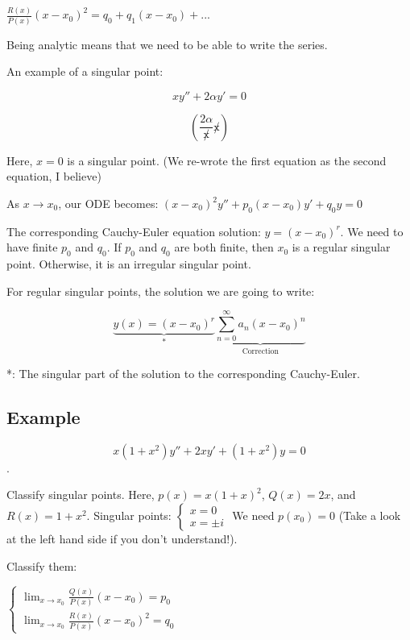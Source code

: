 \documentclass{article}
\begin{document}
$\frac{R(x)}{P(x)} (x - x_0)^2 = q_0 + q_1 (x - x_0) + ...$

Being analytic means that we need to be able to write the series. 

An example of a singular point:


$$xy'' + 2 \alpha y' = 0$$

$$\left(\frac{2 \alpha}{\not x} \not x \right)$$



Here, $x = 0$ is a singular point. (We re-wrote the first equation as the second equation, I believe)

\hfill \break

As $x \longrightarrow x_0$, our ODE becomes: $(x - x_0)^2 y'' + p_0 (x - x_0) y' + q_0 y = 0$

The corresponding Cauchy-Euler equation solution: $y = (x - x_0)^r$. We need to have finite $p_0$ and $q_0$. If $p_0$ and $q_0$ are both finite, then $x_0$ is a regular singular point. Otherwise, it is an irregular singular point. 

For regular singular points, the solution we are going to write: 

$$\underbrace{y(x) = (x - x_0)^r}_{*} \underbrace{\sum_{n = 0}^{\infty} a_n (x - x_0)^n}_{\text{Correction}}$$

*: The singular part of the solution to the corresponding Cauchy-Euler. 

\subsection{Example}

$$x(1+x^2) y'' + 2xy' + (1+x^2) y = 0$$. 

Classify singular points. Here, $p(x) = x(1+x)^2$, $Q(x) = 2x$, and $R(x) = 1+x^2$. Singular points: $\left\{ \begin{matrix} x = 0 \\ x = \pm i \end{matrix} \right.$ We need $p(x_0) = 0$ (Take a look at the left hand side if you don't understand!). 

Classify them:

$\left\{ \begin{matrix} \lim_{x \rightarrow x_0} \frac{Q(x)}{P(x)} (x - x_0) = p_0 \\ \lim_{x \rightarrow x_0} \frac{R(x)}{P(x)} (x - x_0)^2 = q_0 \end{matrix} \right.$
\end{document}
